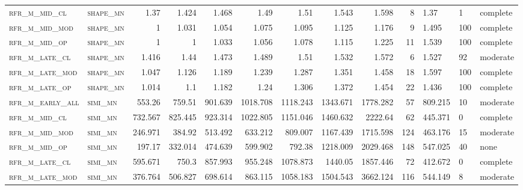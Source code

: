 \begin{landscape}
\begin{center}
\begin{longtable}{llrrrrr|rrr}
\textsc{rfr\_m\_mid\_cl   } & \textsc{shape\_mn }   & 1.37    & 1.424   & 1.468   & 1.49     & 1.51     & 1.543    & 1.598    & 8      & 1.37          & 1             & complete       \\
\textsc{rfr\_m\_mid\_mod  } & \textsc{shape\_mn }   & 1       & 1.031   & 1.054   & 1.075    & 1.095    & 1.125    & 1.176    & 9      & 1.495         & 100           & complete       \\
\textsc{rfr\_m\_mid\_op   } & \textsc{shape\_mn }   & 1       & 1       & 1.033   & 1.056    & 1.078    & 1.115    & 1.225    & 11     & 1.539         & 100           & complete       \\
\textsc{rfr\_m\_late\_cl  } & \textsc{shape\_mn }   & 1.416   & 1.44    & 1.473   & 1.489    & 1.51     & 1.532    & 1.572    & 6      & 1.527         & 92            & moderate       \\
\textsc{rfr\_m\_late\_mod } & \textsc{shape\_mn }   & 1.047   & 1.126   & 1.189   & 1.239    & 1.287    & 1.351    & 1.458    & 18     & 1.597         & 100           & complete       \\
\textsc{rfr\_m\_late\_op  } & \textsc{shape\_mn }   & 1.014   & 1.1     & 1.182   & 1.24     & 1.306    & 1.372    & 1.454    & 22     & 1.436         & 100           & complete       \\
\textsc{rfr\_m\_early\_all} & \textsc{simi\_mn  }   & 553.26  & 759.51  & 901.639 & 1018.708 & 1118.243 & 1343.671 & 1778.282 & 57     & 809.215       & 10            & moderate       \\
\textsc{rfr\_m\_mid\_cl   } & \textsc{simi\_mn  }   & 732.567 & 825.445 & 923.314 & 1022.805 & 1151.046 & 1460.632 & 2222.64  & 62     & 445.371       & 0             & complete           \\
\textsc{rfr\_m\_mid\_mod  } & \textsc{simi\_mn  }   & 246.971 & 384.92  & 513.492 & 633.212  & 809.007  & 1167.439 & 1715.598 & 124    & 463.176       & 15            & moderate       \\
\textsc{rfr\_m\_mid\_op   } & \textsc{simi\_mn  }   & 197.17  & 332.014 & 474.639 & 599.902  & 792.38   & 1218.009 & 2029.468 & 148    & 547.025       & 40            & none       \\
\textsc{rfr\_m\_late\_cl  } & \textsc{simi\_mn  }   & 595.671 & 750.3   & 857.993 & 955.248  & 1078.873 & 1440.05  & 1857.446 & 72     & 412.672       & 0             & complete           \\
\textsc{rfr\_m\_late\_mod } & \textsc{simi\_mn  }   & 376.764 & 506.827 & 698.614 & 863.115  & 1058.183 & 1504.543 & 3662.124 & 116    & 544.149       & 8             & moderate       \\

\end{longtable}
\end{center}
\end{landscape}
